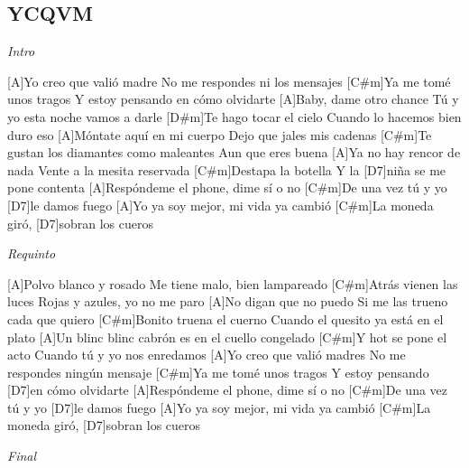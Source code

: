 \subsection{YCQVM}

\noindent
\vspace{1cm}

\begin{guitar}
	\begin{multicols}{2}

	\textit{Intro}
	\par

	[A]Yo creo que valió madre
	No me respondes ni los mensajes
	[C#m]Ya me tomé unos tragos
	Y estoy pensando en cómo olvidarte
	[A]Baby, dame otro chance
	Tú y yo esta noche vamos a darle
	[D#m]Te hago tocar el cielo
	Cuando lo hacemos bien duro eso
	[A]Móntate aquí en mi cuerpo
	Dejo que jales mis cadenas
	[C#m]Te gustan los diamantes como maleantes
	Aun que eres buena
	[A]Ya no hay rencor de nada
	Vente a la mesita reservada
	[C#m]Destapa la botella
	Y la [D7]niña se me pone contenta
	[A]Respóndeme el phone, dime sí o no
	[C#m]De una vez tú y yo [D7]le damos fuego
	[A]Yo ya soy mejor, mi vida ya cambió
	[C#m]La moneda giró, [D7]sobran los cueros

	\textit{Requinto}

	[A]Polvo blanco y rosado
	Me tiene malo, bien lampareado
	[C#m]Atrás vienen las luces
	Rojas y azules, yo no me paro
	[A]No digan que no puedo
	Si me las trueno cada que quiero
	[C#m]Bonito truena el cuerno
	Cuando el quesito ya está en el plato
	[A]Un blinc blinc cabrón
	es en el cuello congelado
	[C#m]Y hot se pone el acto
	Cuando tú y yo nos enredamos
	[A]Yo creo que valió madres
	No me respondes ningún mensaje
	[C#m]Ya me tomé unos tragos
	Y estoy pensando [D7]en cómo olvidarte
	[A]Respóndeme el phone, dime sí o no
	[C#m]De una vez tú y yo [D7]le damos fuego
	[A]Yo ya soy mejor, mi vida ya cambió
	[C#m]La moneda giró, [D7]sobran los cueros


	\textit{Final}
\end{multicols}
\end{guitar}


